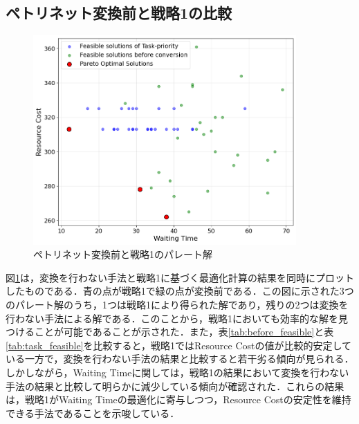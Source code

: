 \subsection{ペトリネット変換前と戦略1の比較}
\begin{figure}[H]
    \centering
    \includegraphics[width=0.8\linewidth, height=8cm]{./images/task_and_before_job5.png}
    \caption{ペトリネット変換前と戦略1のパレート解}
    \label{fig:fig9}
\end{figure}

図\ref{fig:fig9}は，変換を行わない手法と戦略1に基づく最適化計算の結果を同時にプロットしたものである．青の点が戦略1で緑の点が変換前である．この図に示された3つのパレート解のうち，1つは戦略1により得られた解であり，残りの2つは変換を行わない手法による解である．このことから，戦略1においても効率的な解を見つけることが可能であることが示された．また，表\ref{tab:before_feasible}と表\ref{tab:task_feasible}を比較すると，戦略1ではResource Costの値が比較的安定している一方で，変換を行わない手法の結果と比較すると若干劣る傾向が見られる．しかしながら，Waiting Timeに関しては，戦略1の結果において変換を行わない手法の結果と比較して明らかに減少している傾向が確認された．これらの結果は，戦略1がWaiting Timeの最適化に寄与しつつ，Resource Costの安定性を維持できる手法であることを示唆している．

